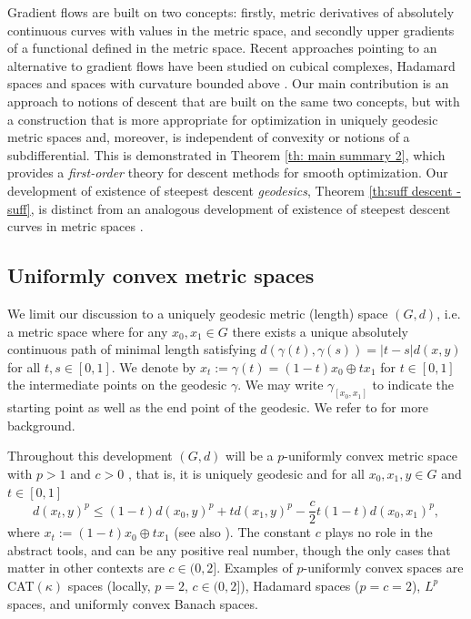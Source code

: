 \documentclass{article}
\theoremstyle{plain}\newtheorem{theorem}{Theorem}[section]
\theoremstyle{plain}\newtheorem{definition}[theorem]{Definition}
\theoremstyle{plain}\newtheorem{lemma}[theorem]{Lemma}
\theoremstyle{definition}\newtheorem{remark}[theorem]{Remark}
\theoremstyle{definition}\newtheorem{example}[theorem]{Example}
\theoremstyle{plain}\newtheorem{proposition}[theorem]{Proposition}
\theoremstyle{plain}\newtheorem{inference}[theorem]{Inference}
\theoremstyle{plain}\newtheorem{corollary}[theorem]{Corollary}
\theoremstyle{plain}\newtheorem{assumption}[theorem]{Assumption}
\begin{document}
Gradient flows are built on two concepts: firstly, metric derivatives of absolutely continuous curves with values in the metric space, and secondly upper gradients of a functional defined in the metric space. Recent approaches pointing to an alternative to gradient flows have been studied on cubical complexes, Hadamard spaces and spaces with curvature bounded above \cite{GooLewLopNic26, GooLewLopNic_cat0cc, GooLewLopNicFoCM, LewLopNic_SIOPT24}. Our main contribution is an approach to notions of descent that are built on the same two concepts, but with a construction that is more appropriate for optimization in uniquely geodesic metric spaces and, moreover, is independent of convexity or notions of a subdifferential. This is demonstrated in Theorem \ref{th: main summary 2}, which provides a {\em first-order} theory for descent methods for smooth optimization. Our development of existence of steepest descent {\em geodesics}, Theorem \ref{th:suff descent - suff}, is distinct from an analogous development of existence of steepest descent curves in metric spaces \cite{DeGMarTos80}.

\subsection{Uniformly convex metric spaces}
We limit our discussion to a uniquely geodesic metric (length) space $(G,d)$, i.e. a metric space where for any $x_0,x_1\in G$ there exists a unique absolutely continuous path of minimal length satisfying $d(\gamma(t),\gamma(s))=|t-s|d(x,y)$ for all $t,s\in[0,1]$. We denote by $x_t:=\gamma(t)=(1-t)x_0\oplus tx_1$ for $t\in[0,1]$ the intermediate points on the geodesic $\gamma$. We may write $\gamma_{[x_0,x_1]}$ to indicate the starting point as well as the end point of the geodesic. We refer to \cite[Section 2]{BurBurIva} for more background.

Throughout this development $(G,d)$ will be a $p$-uniformly convex metric space with $p>1$ and $c>0$ \cite[Definition 2.1]{RuiLopNic15}, 
that is, it is uniquely geodesic and for all $x_0,x_1,y\in G$ and $t\in[0,1]$
\begin{equation}\label{eq: (p,c)-space}
    d(x_t,y)^p\leq (1-t)d(x_0,y)^p+td(x_1,y)^p-\frac{c}{2}t(1-t)d(x_0,x_1)^p,
\end{equation}
where $x_t:=(1-t)x_0\oplus tx_1$ (see also \cite[pp468]{BalCarLie94}). 
The constant $c$ plays no role in the abstract tools, and can be any positive real number, though the only cases that matter in other contexts are $c\in (0,2]$. 
Examples of $p$-uniformly convex spaces are CAT$(\kappa)$ spaces (locally, $p=2$, $c\in(0,2]$), Hadamard spaces ($p=c=2$),
$L^p$ spaces, and uniformly convex Banach spaces.  
\end{document}
